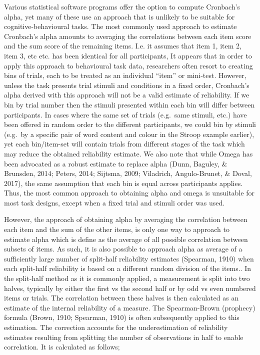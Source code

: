 \documentclass[english,,man,floatsintext]{apa6}
\begin{document}
Various statistical software programs offer the option to compute Cronbach's alpha, yet many of these use an approach that is unlikely to be suitable for cognitive-behavioural tasks. The most commonly used approach to estimate Cronbach's alpha amounts to averaging the correlations between each item score and the sum score of the remaining items. I.e. it assumes that item 1, item 2, item 3, etc etc. has been identical for all participants, It appears that in order to apply this approach to behavioural task data, researchers often resort to creating bins of trials, each to be treated as an individual \enquote{item} or mini-test. However, unless the task presents trial stimuli and conditions in a fixed order, Cronbach's alpha derived with this approach will not be a valid estimate of reliability. If we bin by trial number then the stimuli presented within each bin will differ between participants. In cases where the same set of trials (e.g.~same stimuli, etc.) have been offered in random order to the different participants, we could bin by stimuli (e.g.~by a specific pair of word content and colour in the Stroop example earlier), yet each bin/item-set will contain trials from different stages of the task which may reduce the obtained reliability estimate. We also note that while Omega has been advocated as a robust estimate to replace alpha (Dunn, Baguley, \& Brunsden, 2014; Peters, 2014; Sijtsma, 2009; Viladrich, Angulo-Brunet, \& Doval, 2017), the same assumption that each bin is equal across participants applies. Thus, the most common approach to obtaining alpha and omega is unsuitable for most task designs, except when a fixed trial and stimuli order was used.

However, the approach of obtaining alpha by averaging the correlation between each item and the sum of the other items, is only one way to approach to estimate alpha which is define as the average of all possible correlation between subsets of items. As such, it is also possible to approach alpha as average of a sufficiently large number of split-half reliability estimates (Spearman, 1910) when each split-half reliability is based on a different random division of the items.. In the split-half method as it is commonly applied, a measurement is split into two halves, typically by either the first vs the second half or by odd vs even numbered items or trials. The correlation between these halves is then calculated as an estimate of the internal reliability of a measure. The Spearman-Brown (prophecy) formula (Brown, 1910; Spearman, 1910) is often subsequently applied to this estimation. The correction accounts for the underestimation of reliability estimates resulting from splitting the number of observations in half to enable correlation. It is calculated as follows;
\end{document}
